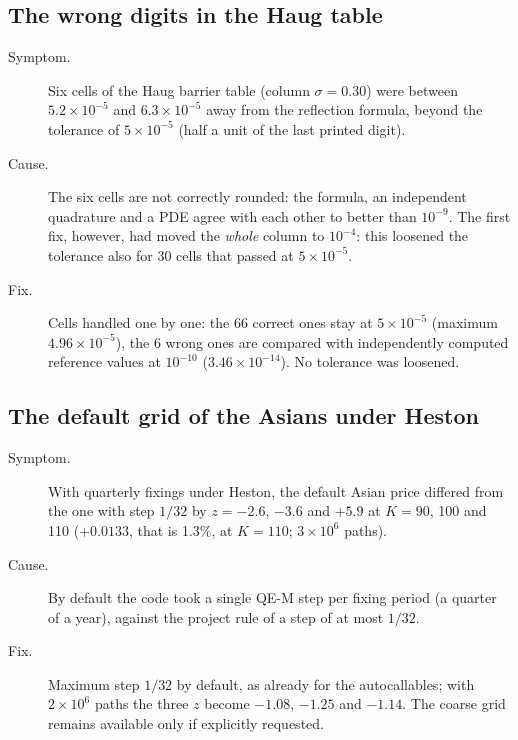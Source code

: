\subsection{The wrong digits in the Haug table}
\begin{description}
\item[Symptom.] Six cells of the Haug barrier table (column $\sigma=0.30$) were between $5.2\times10^{-5}$ and
$6.3\times10^{-5}$ away from the reflection formula, beyond the tolerance of $5\times10^{-5}$ (half a unit of the last
printed digit).
\item[Cause.] The six cells are not correctly rounded: the formula, an independent quadrature and a PDE agree with
each other to better than $10^{-9}$. The first fix, however, had moved the \emph{whole} column to $10^{-4}$: this
loosened the tolerance also for 30 cells that passed at $5\times10^{-5}$.
\item[Fix.] Cells handled one by one: the 66 correct ones stay at $5\times10^{-5}$ (maximum $4.96\times10^{-5}$), the
6 wrong ones are compared with independently computed reference values at $10^{-10}$ ($3.46\times10^{-14}$). No
tolerance was loosened.
\end{description}

\subsection{The default grid of the Asians under Heston}
\begin{description}
\item[Symptom.] With quarterly fixings under Heston, the default Asian price differed from the one with step $1/32$
by $z=-2.6$, $-3.6$ and $+5.9$ at $K=90$, 100 and 110 ($+0.0133$, that is 1.3\%, at $K=110$; $3\times10^6$ paths).
\item[Cause.] By default the code took a single QE-M step per fixing period (a quarter of a year), against the project
rule of a step of at most $1/32$.
\item[Fix.] Maximum step $1/32$ by default, as already for the autocallables; with $2\times10^6$ paths the three $z$
become $-1.08$, $-1.25$ and $-1.14$. The coarse grid remains available only if explicitly requested.
\end{description}

